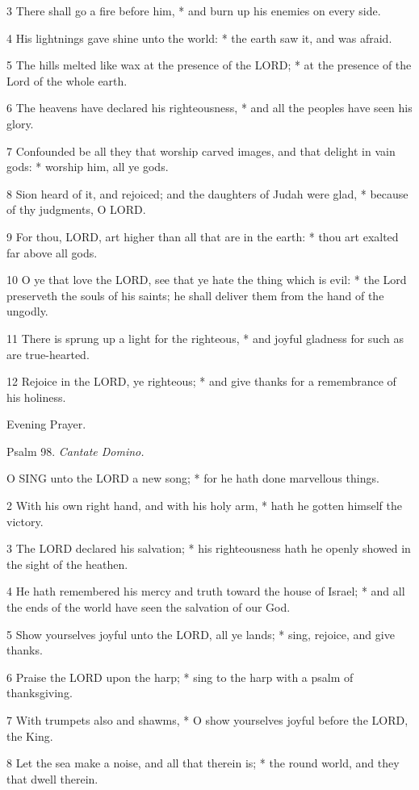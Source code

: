 3 There shall go a fire before him, * and burn up his
enemies on every side.

4 His lightnings gave shine unto the world: * the earth
saw it, and was afraid.

5 The hills melted like wax at the presence of the
LORD; * at the presence of the Lord of the whole earth.

6 The heavens have declared his righteousness, * and
all the peoples have seen his glory.

7 Confounded be all they that worship carved images,
and that delight in vain gods: * worship him, all ye gods.

8 Sion heard of it, and rejoiced; and the daughters
of Judah were glad, * because of thy judgments, O LORD.

9 For thou, LORD, art higher than all that are in the
earth: * thou art exalted far above all gods.

10 O ye that love the LORD, see that ye hate the thing
which is evil: * the Lord preserveth the souls of his saints; he shall
deliver them from the hand of the ungodly.

11 There is sprung up a light for the righteous, *
and joyful gladness for such as are true-hearted.

12 Rejoice in the LORD, ye righteous; * and give thanks
for a remembrance of his holiness. 

Evening
Prayer.

Psalm
98. \emph{Cantate Domino.}

O
SING unto the LORD a new song; * for he hath done marvellous things.

2 With his own right hand, and with his holy arm, *
hath he gotten himself the victory.

3 The LORD declared his salvation; * his righteousness
hath he openly showed in the sight of the heathen.

4 He hath remembered his mercy and truth toward the
house of Israel; * and all the ends of the world have seen the salvation
of our God.

5 Show yourselves joyful unto the LORD, all ye lands;
* sing, rejoice, and give thanks.

6 Praise the LORD upon the harp; * sing to the harp
with a psalm of thanksgiving.

7 With trumpets also and shawms, * O show yourselves
joyful before the LORD, the King.

8 Let the sea make a noise, and all that therein is;
* the round world, and they that dwell therein.

